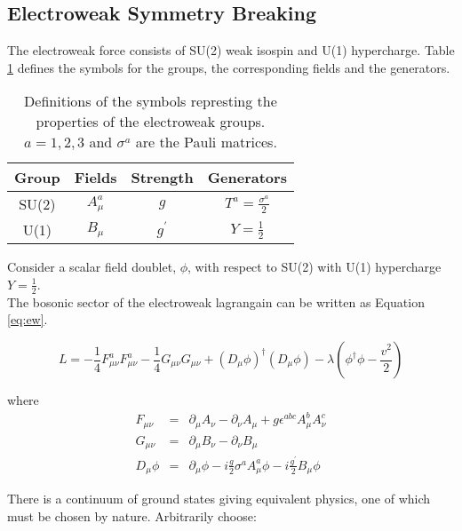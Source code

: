 \subsection{Electroweak Symmetry Breaking}

The electroweak force consists of SU(2) weak isospin and U(1) hypercharge. Table 
\ref{tab:ewk} defines the symbols for the groups, the corresponding fields and 
the generators. \\

\begin{table}
\begin{center}
\begin{tabular}{|c|c|c|c|}
\hline
Group & Fields & Strength & Generators \\
\hline
SU(2) & $A_{\mu}^{a}$ & $g$ & $T^{a} = \frac{\sigma^{a}}{2}$ \\
U(1) & $B_{\mu}$ & $g^{\prime}$ & $Y = \frac{1}{2}$ \\
\hline
\end{tabular}
\end{center}
\caption{Definitions of the symbols represting the properties of the electroweak
groups. $a = 1, 2, 3$ and $\sigma^{a}$ are the Pauli matrices.}
\label{tab:ewk}
\end{table}

Consider a scalar field doublet, $\phi$, with respect to SU(2) with U(1) 
hypercharge $Y = \frac{1}{2}$. \\

The bosonic sector of the electroweak lagrangain can be written as Equation 
\ref{eq:ew}.

\begin{equation}
L = -\frac{1}{4}F_{\mu\nu}^{a}F_{\mu\nu}^{a}
-\frac{1}{4}G_{\mu\nu}G_{\mu\nu} + (D_{\mu}\phi)^{\dagger}(D_{\mu}\phi) -
\lambda\left(\phi^{\dagger}\phi - \frac{v^{2}}{2}\right)
\label{eq:ew}
\end{equation}

where
\begin{eqnarray}
F_{\mu\nu} &=& \partial_{\mu}A_{\nu} - \partial_{\nu}A_{\mu} +
g\epsilon^{abc}A_{\mu}^{b}A_{\nu}^{c} \\
G_{\mu\nu} &=& \partial_{\mu}B_{\nu} - \partial_{\nu}B_{\mu} \\
D_{\mu}\phi &=& \partial_{\mu}\phi - i\frac{g}{2}\sigma^{a}A_{\mu}^{a}\phi -
i\frac{g^{\prime}}{2}B_{\mu}\phi
\end{eqnarray}

There is a continuum of ground states giving equivalent physics, one of which
must be chosen by nature. Arbitrarily choose:

